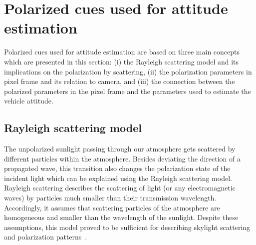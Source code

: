 \graphicspath{{./content/intro/figures/}}

\section{Polarized cues used for attitude estimation}
\label{sec:pcues}

Polarized cues used for attitude estimation are based on three main concepts
which are presented in this section: (i) the Rayleigh scattering model and its
implications on the polarization by scattering, (ii) the polarization
parameters in pixel frame and its relation to camera, and (iii) the connection
between the polarized parameters in the pixel frame and the parameters used to
estimate the vehicle attitude.


\subsection{Rayleigh scattering model}
\label{subsec:rayleigh}
The unpolarized sunlight passing through our atmosphere gets scattered by
different particles within the atmosphere. Besides deviating the direction of
a propagated wave, this transition also changes the polarization state of the
incident light which can be explained using the Rayleigh scattering model.
Rayleigh scattering describes the scattering of light (or any
electromagnetic waves) by particles much smaller than their transmission
wavelength. Accordingly, it assumes that scattering particles of the atmosphere
are homogeneous and smaller than the wavelength of the sunlight. Despite these
assumptions, this model proved to be sufficient for describing skylight
scattering and polarization
patterns~\cite{pomozi2001clearsky,horvath2002ground}.

